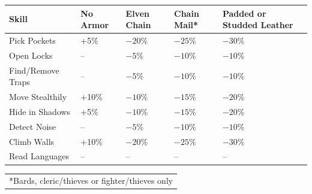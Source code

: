 \noindent
\begin{minipage}{\columnwidth}

\label{thiefarmormods}
\noindent
\begin{tabular}{|m{}|m{}|m{}|m{}|m{}|}
\hline
Skill				& No Armor	& Elven Chain	& Chain Mail*	& Padded or Studded Leather \\
\hline\hline
\rowcolor[gray]{.9}Pick Pockets		& +5\%		& $-20$\%	& $-25$\%	& $-30$\% \\
Open Locks			& --		& $-5$\%	& $-10$\%	& $-10$\% \\
\rowcolor[gray]{.9}Find/Remove Traps	& --		& $-5$\%	& $-10$\%	& $-10$\% \\
Move Stealthily		& +10\%		& $-10$\%	& $-15$\%	& $-20$\% \\
\rowcolor[gray]{.9}Hide in Shadows		& +5\%		& $-10$\%	& $-15$\%	& $-20$\% \\
Detect Noise		& --		& $-5$\%	& $-10$\%	& $-10$\% \\
\rowcolor[gray]{.9}Climb Walls			& +10\%		& $-20$\%	& $-25$\%	& $-30$\% \\
Read Languages		& --		& --		& --		& -- \\
\hline
\end{tabular}
\noindent
\begin{tabular}{p{}}
*Bards, cleric/thieves or fighter/thieves only\\
\end{tabular}\vspace{.5em}

\end{minipage}

